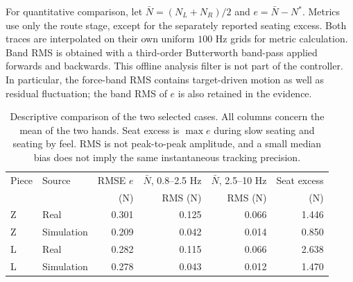 

For quantitative comparison, let $\bar N=(N_L+N_R)/2$ and $e=\bar N-N^*$. Metrics use only the route stage, except for the separately reported seating excess. Both traces are interpolated on their own uniform $100$ Hz grids for metric calculation. Band RMS is obtained with a third-order Butterworth band-pass applied forwards and backwards. This offline analysis filter is not part of the controller. In particular, the force-band RMS contains target-driven motion as well as residual fluctuation; the band RMS of $e$ is also retained in the evidence.

\begin{table}[htbp]\centering\small
\setlength{\tabcolsep}{4pt}
\begin{tabular}{@{}llrrrr@{}}\toprule
Piece & Source & RMSE $e$ & $\bar N$, 0.8--2.5 Hz & $\bar N$, 2.5--10 Hz & Seat excess\\
& & (N) & RMS (N) & RMS (N) & (N)\\\midrule
Z & Real & 0.301 & 0.125 & 0.066 & 1.446\\
Z & Simulation & 0.209 & 0.042 & 0.014 & 0.850\\
L & Real & 0.282 & 0.115 & 0.066 & 2.638\\
L & Simulation & 0.278 & 0.043 & 0.012 & 1.470\\\bottomrule
\end{tabular}
\caption{Descriptive comparison of the two selected cases. All columns concern the mean of the two hands. Seat excess is $\max e$ during slow seating and seating by feel. RMS is not peak-to-peak amplitude, and a small median bias does not imply the same instantaneous tracking precision.}
\label{tab:kinova-real-sim}
\end{table}

